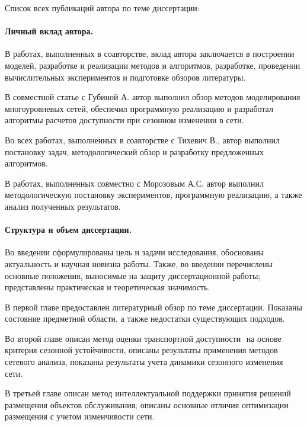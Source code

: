 Список всех публикаций автора по теме диссертации:
\begin{refsection}
\nocite{*}
\printbibliography[
    keyword=own,
    heading=none,
    resetnumbers=true
]
\end{refsection}


\paragraph*{Личный вклад автора.}
В работах, выполненных в соавторстве, вклад автора заключается в
построении моделей, разработке и реализации методов и алгоритмов, разработке, проведении вычислительных экспериментов и подготовке обзоров литературы.

В совместной статье с Губиной А. автор выполнил обзор методов моделирования многоуровневых сетей, обеспечил программную реализацию и разработал алгоритмы расчетов доступности при сезонном изменении в сети.

Во всех работах, выполненных в соавторстве с Тихевич В., автор выполнил постановку задач, методологический обзор и разработку предложенных алгоритмов.

В работах, выполненных совместно с Морозовым А.С. автор выполнил методологическую постановку экспериментов, программную реализацию, а также анализ полученных результатов.

\paragraph*{Структура и объем диссертации.}
Во введении сформулированы цель и задачи
исследования, обоснованы актуальность и научная новизна работы. Также, во введении перечислены основные положения, выносимые на защиту диссертационной работы; представлены практическая и теоретическая значимость.

В первой главе предоставлен литературный обзор по теме диссертации. Показаны состояние предметной области, а также недостатки существующих подходов.

Во второй главе описан метод оценки транспортной доступности  на основе критерия сезонной устойчивости, описаны результаты применения методов сетевого анализа, показаны результаты учета динамики сезонного изменения сети.

В третьей главе описан метод интеллектуальной поддержки принятия решений размещения объектов обслуживания; описаны основные отличия оптимизации размещения с учетом изменчивости сети.


